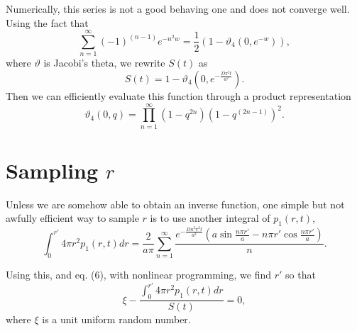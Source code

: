 \documentclass{article}
\begin{document}
Numerically, this series is not a good behaving one and does not converge well.
Using the fact that
\begin{equation}
\sum_{n=1}^{\infty} (-1)^{(n-1)} e^{- n^2 w} = 
\frac{1}{2} ( 1 - \vartheta_4( 0, e^{-w} ) ),
\end{equation}
where $\vartheta$ is Jacobi's theta, we rewrite $S(t)$ as 
\begin{equation}
S(t) = 1 - \vartheta_4( 0, e^{- \frac{D \pi^2 t}{a^2}} ).
\end{equation}
Then we can efficiently evaluate this function through a product 
representation
\begin{equation}
\vartheta_4( 0, q ) = \prod_{n=1}^{\infty} (1-q^{2n})(1-q^{(2n-1)})^2.
\end{equation}

\section{Sampling $r$}

Unless we are somehow able to obtain an inverse function, one
simple but not awfully efficient way to sample $r$ is to use another
integral of $p_1(r,t)$,
\begin{equation}
\int_{0}^{r'} 4 \pi r^2 p_1(r,t) dr = \frac{2}{a \pi} 
\sum_{n=1}^{\infty} \frac{e^{- \frac{D n^2 \pi^2 t}{a^2}}
\left( a \sin \frac{n \pi r'}{a} - n \pi r' \cos \frac{n \pi r'}{a} \right)}
{n}.
\end{equation}

Using this, and eq. (6), with nonlinear programming, we find $r'$ so that
\begin{equation}
\xi - \frac{\int_{0}^{r'} 4 \pi r^2 p_1(r,t) dr}{S(t)} = 0,
\end{equation}
where $\xi$ is a unit uniform random number.


\end{document}
